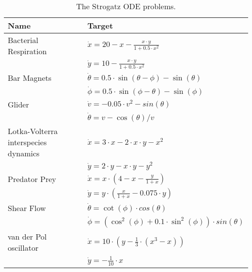 \begin{table}[htb]
\scriptsize
\centering
\renewcommand{\arraystretch}{1.2}\addtolength{\tabcolsep}{.5pt}
\caption{The Strogatz ODE problems. 
         } \label{tbl:strogatz}
\begin{tabular}{ll} %
 Name & Target \\ \toprule 
Bacterial Respiration                   & $\dot{x} = 20 - x - \frac{x \cdot y}{1+0.5 \cdot x^2}$ \\	
                                        & $ \dot{y} = 10 - \frac{x \cdot y}{1+0.5 \cdot x^2}$	\\ 
\midrule
Bar Magnets                             & $\dot{\theta} = 0.5 \cdot \sin (\theta - \phi) - \sin (\theta)$	\\
                                        & $ \dot{\phi} = 0.5 \cdot \sin (\phi - \theta) - \sin (\phi)$ \\ 
\midrule
Glider                                  & $\dot{v} = - 0.05 \cdot  v^2 - sin (\theta)$	\\
                                        & $ \dot{\theta} = v - \cos (\theta)/v$	\\ 
\midrule
Lotka-Volterra interspecies dynamics    & $\dot{x} = 3  \cdot x - 2  \cdot x \cdot y - x^2$	\\
                                        & $ \dot{y} = 2 \cdot y - x \cdot y - y^2$	\\ 
\midrule
Predator Prey                           & $\dot{x} = x  \cdot \left( 4 - x - \frac{y}{1+x} \right)$	\\
                                        & $\dot{y} = y \cdot \left( \frac{x}{1+x} - 0.075 \cdot y \right)$	\\ 
\midrule
Shear Flow                              & $\dot{\theta} = \cot (\phi) \cdot cos(\theta)$	\\
                                        & $ \dot{\phi} = \left(\cos ^2 (\phi) + 0.1 \cdot  \sin^2 (\phi)\right) \cdot sin(\theta)$	\\ 
\midrule
van der Pol oscillator                  & $\dot{x} = 10 \cdot  \left(y - \frac{1}{3} \cdot (x^3-x) \right)$	\\
                                        & $ \dot{y} = -\frac{1}{10} \cdot x$ \\
\bottomrule
\end{tabular}
\end{table}
